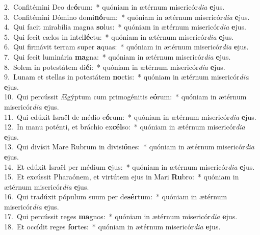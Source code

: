 {2.~}Confitémini Deo de\textbf{ó}rum:~* quóniam in ætérnum misericór\textit{di}\textit{a} \textbf{e}jus.\\
{3.~}Confitémini Dómino domi\textbf{nó}rum:~* quóniam in ætérnum misericór\textit{di}\textit{a} \textbf{e}jus.\\
{4.~}Qui facit mirabília magna \textbf{so}lus:~* quóniam in ætérnum misericór\textit{di}\textit{a} \textbf{e}jus.\\
{5.~}Qui fecit cælos in intel\textbf{lé}ctu:~* quóniam in ætérnum misericór\textit{di}\textit{a} \textbf{e}jus.\\
{6.~}Qui firmávit terram super \textbf{a}quas:~* quóniam in ætérnum misericór\textit{di}\textit{a} \textbf{e}jus.\\
{7.~}Qui fecit luminária \textbf{ma}gna:~* quóniam in ætérnum misericór\textit{di}\textit{a} \textbf{e}jus.\\
{8.~}Solem in potestátem di\textbf{é}i:~* quóniam in ætérnum misericór\textit{di}\textit{a} \textbf{e}jus.\\
{9.~}Lunam et stellas in potestátem \textbf{no}ctis:~* quóniam in ætérnum misericór\textit{di}\textit{a} \textbf{e}jus.\\
{10.~}Qui percússit Ægýptum cum primogénitis e\textbf{ó}rum:~* quóniam in ætérnum misericór\textit{di}\textit{a} \textbf{e}jus.\\
{11.~}Qui edúxit Israël de médio e\textbf{ó}rum:~* quóniam in ætérnum misericór\textit{di}\textit{a} \textbf{e}jus.\\
{12.~}In manu poténti, et bráchio ex\textbf{cél}so:~* quóniam in ætérnum misericór\textit{di}\textit{a} \textbf{e}jus.\\
{13.~}Qui divísit Mare Rubrum in divisi\textbf{ó}nes:~* quóniam in ætérnum misericór\textit{di}\textit{a} \textbf{e}jus.\\
{14.~}Et edúxit Israël per médium \textbf{e}jus:~* quóniam in ætérnum misericór\textit{di}\textit{a} \textbf{e}jus.\\
{15.~}Et excússit Pharaónem, et virtútem ejus in Mari \textbf{Ru}bro:~* quóniam in ætérnum misericór\textit{di}\textit{a} \textbf{e}jus.\\
{16.~}Qui tradúxit pópulum suum per de\textbf{sér}tum:~* quóniam in ætérnum misericór\textit{di}\textit{a} \textbf{e}jus.\\
{17.~}Qui percússit reges \textbf{ma}gnos:~* quóniam in ætérnum misericór\textit{di}\textit{a} \textbf{e}jus.\\
{18.~}Et occídit reges \textbf{for}tes:~* quóniam in ætérnum misericór\textit{di}\textit{a} \textbf{e}jus.\\
